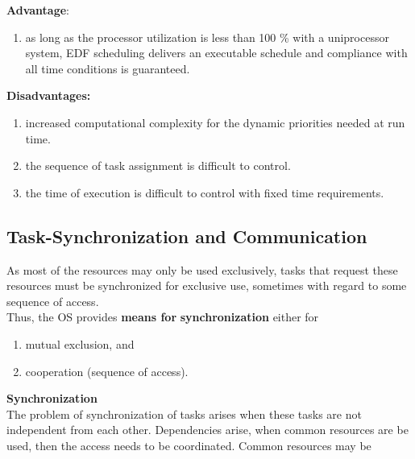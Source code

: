 \textbf{Advantage}: 

\begin{enumerate}
\item  as long as the processor utilization is less than 100 \% with a uniprocessor system, EDF  scheduling delivers an executable schedule and compliance with all time conditions is guaranteed.
\end{enumerate}

\textbf{Disadvantages:}

\begin{enumerate}
\item \textbf{ }increased computational complexity for the dynamic priorities needed at run time.

\item  the sequence of task assignment is difficult to control.

\item  the time of execution is difficult to control with fixed time requirements.
\end{enumerate}

\subsection{  Task-Synchronization and Communication}

As most of the resources may only be used exclusively, tasks that request these resources must be synchronized for exclusive use, sometimes with regard to some sequence of access. \\

Thus, the OS provides \textbf{means for} \textbf{synchronization} either for 

\begin{enumerate}
\item  mutual exclusion, and 
\item  cooperation (sequence of access).
\end{enumerate}

{\rot\bf Synchronization }\\

The problem of synchronization of tasks arises when these tasks are not independent from each other. Dependencies arise, when common resources are be used, then the access needs to be coordinated. Common resources may be

